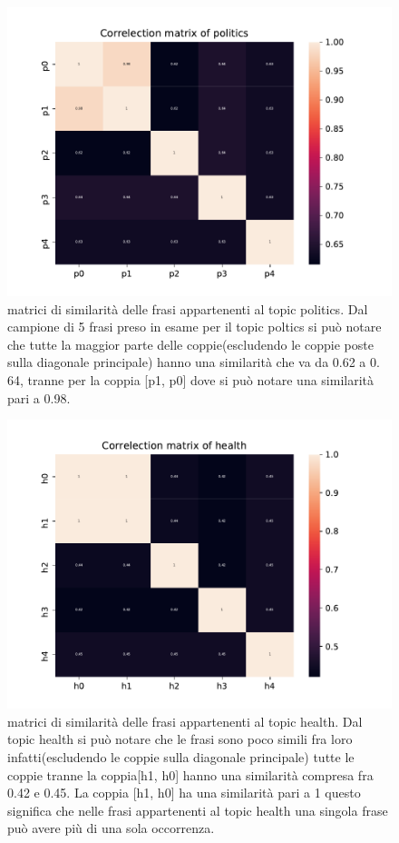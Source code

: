 \begin{figure}[h!t]
    \centering
    \includegraphics{Figure/simMatr/politics.pdf}
    \caption{matrici di similarità delle frasi appartenenti al topic politics. Dal campione di 5 frasi preso in esame per il topic poltics si può notare che tutte la maggior parte delle coppie(escludendo le coppie poste sulla diagonale principale) hanno una similarità che va da 0.62 a 0. 64, tranne per la coppia [p1, p0] dove si può notare una similarità pari a 0.98.}
    \label{fig:mtrsim_p}
\end{figure}
\FloatBarrier

\begin{figure}[h!t]
    \centering
    \includegraphics{Figure/simMatr/health.pdf}
    \caption{matrici di similarità delle frasi appartenenti al topic health. Dal topic health si può notare che le frasi sono poco simili fra loro infatti(escludendo le coppie sulla diagonale principale) tutte le coppie tranne la coppia[h1, h0] hanno una similarità compresa fra 0.42 e 0.45. La coppia [h1, h0] ha una similarità pari a 1 questo significa che nelle frasi appartenenti al topic health una singola frase può avere più di una sola occorrenza.}
    \label{fig:mtrsim_h}
\end{figure}
\FloatBarrier

